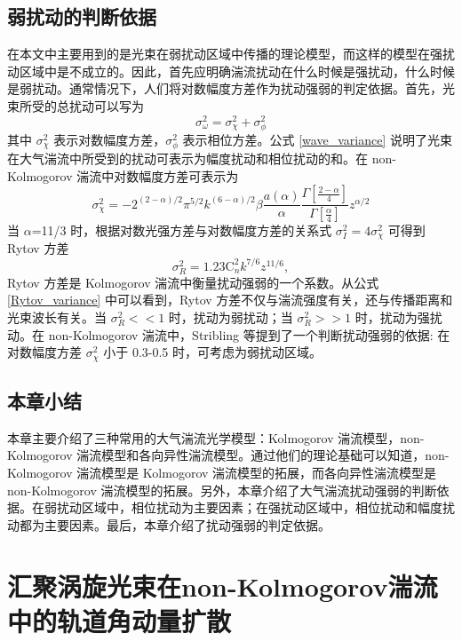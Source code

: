 \documentclass[master]{thesis-uestc}
\begin{document}
\section{弱扰动的判断依据}
在本文中主要用到的是光束在弱扰动区域中传播的理论模型，而这样的模型在强扰动区域中是不成立的。因此，首先应明确湍流扰动在什么时候是强扰动，什么时候是弱扰动。通常情况下，人们将对数幅度方差作为扰动强弱的判定依据。首先，光束所受的总扰动可以写为
\begin{equation}\label{wave_variance}
\sigma_\omega^2=\sigma_\chi^2+\sigma_\phi^2
\end{equation}
\noindent 其中 $\sigma_\chi^2$ 表示对数幅度方差，$\sigma_\phi^2$ 表示相位方差。公式 \eqref{wave_variance} 说明了光束在大气湍流中所受到的扰动可表示为幅度扰动和相位扰动的和。在 non-Kolmogorov 湍流中对数幅度方差可表示为
\begin{equation}\label{wave_variance1}
\sigma_\chi^2=-2^{(2-\alpha)/2}\pi^{5/2}k^{(6-\alpha)/2}\beta\frac{a(\alpha)}{\alpha}\frac{\Gamma\left[\frac{2-\alpha}{4}\right]}{\Gamma\left[\frac{\alpha}{4}\right]}z^{\alpha/2}
\end{equation}
当 $\alpha$=11/3 时，根据对数光强方差与对数幅度方差的关系式 $\sigma_I^2=4\sigma_\chi^2$ 可得到 Rytov 方差
\begin{equation}\label{Rytov_variance}
\sigma^2_{R}=1.23\mathrm{C}^2_{n}k^{7/6}z^{11/6},
\end{equation}
Rytov 方差是 Kolmogorov 湍流中衡量扰动强弱的一个系数。从公式 \eqref{Rytov_variance} 中可以看到，Rytov 方差不仅与湍流强度有关，还与传播距离和光束波长有关。当 $\sigma^2_{R}<<1$ 时，扰动为弱扰动；当 $\sigma^2_{R}>>1$ 时，扰动为强扰动。在 non-Kolmogorov 湍流中，Stribling 等提到了一个判断扰动强弱的依据\citeup{}: 在对数幅度方差 $\sigma_\chi^2$ 小于 0.3-0.5 时，可考虑为弱扰动区域。

\section{本章小结}
本章主要介绍了三种常用的大气湍流光学模型：Kolmogorov 湍流模型，non-Kolmogorov 湍流模型和各向异性湍流模型。通过他们的理论基础可以知道，non-Kolmogorov 湍流模型是 Kolmogorov 湍流模型的拓展，而各向异性湍流模型是 non-Kolmogorov 湍流模型的拓展。另外，本章介绍了大气湍流扰动强弱的判断依据。在弱扰动区域中，相位扰动为主要因素；在强扰动区域中，相位扰动和幅度扰动都为主要因素。最后，本章介绍了扰动强弱的判定依据。


\chapter{汇聚涡旋光束在non-Kolmogorov湍流中的轨道角动量扩散}
\end{document}
